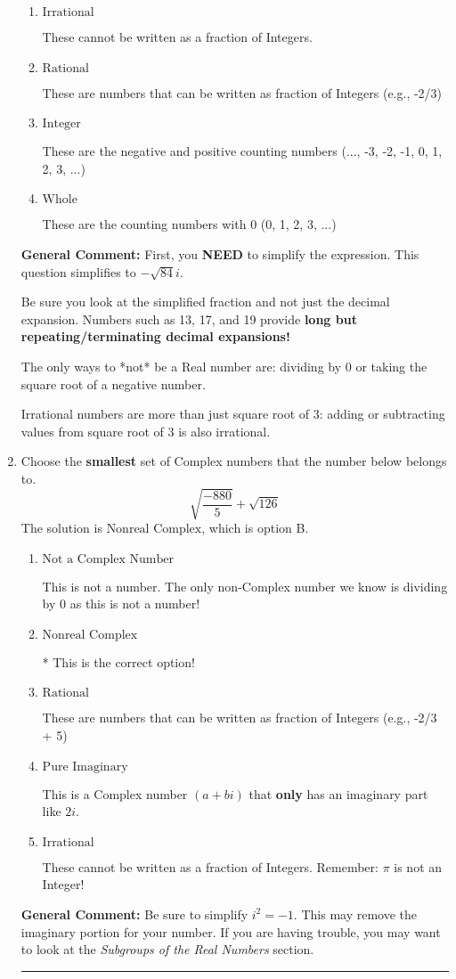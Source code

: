 \documentclass{extbook}[14pt]
\newcommand{\litem}[1]{\item #1

\rule{\textwidth}{0.4pt}}
\begin{document}
\begin{enumerate}
{\begin{enumerate}[label=\Alph*.]
* This is the correct option!
\item \( \text{Irrational} \)

These cannot be written as a fraction of Integers.
\item \( \text{Rational} \)

These are numbers that can be written as fraction of Integers (e.g., -2/3)
\item \( \text{Integer} \)

These are the negative and positive counting numbers (..., -3, -2, -1, 0, 1, 2, 3, ...)
\item \( \text{Whole} \)

These are the counting numbers with 0 (0, 1, 2, 3, ...)
\end{enumerate}

\textbf{General Comment:} First, you \textbf{NEED} to simplify the expression. This question simplifies to $-\sqrt{84} i$. 
 
 Be sure you look at the simplified fraction and not just the decimal expansion. Numbers such as 13, 17, and 19 provide \textbf{long but repeating/terminating decimal expansions!} 
 
 The only ways to *not* be a Real number are: dividing by 0 or taking the square root of a negative number. 
 
 Irrational numbers are more than just square root of 3: adding or subtracting values from square root of 3 is also irrational.
}
\litem{
Choose the \textbf{smallest} set of Complex numbers that the number below belongs to.
\[ \sqrt{\frac{-880}{5}}+\sqrt{126} \]The solution is \( \text{Nonreal Complex} \), which is option B.\begin{enumerate}[label=\Alph*.]
\item \( \text{Not a Complex Number} \)

This is not a number. The only non-Complex number we know is dividing by 0 as this is not a number!
\item \( \text{Nonreal Complex} \)

* This is the correct option!
\item \( \text{Rational} \)

These are numbers that can be written as fraction of Integers (e.g., -2/3 + 5)
\item \( \text{Pure Imaginary} \)

This is a Complex number $(a+bi)$ that \textbf{only} has an imaginary part like $2i$.
\item \( \text{Irrational} \)

These cannot be written as a fraction of Integers. Remember: $\pi$ is not an Integer!
\end{enumerate}

\textbf{General Comment:} Be sure to simplify $i^2 = -1$. This may remove the imaginary portion for your number. If you are having trouble, you may want to look at the \textit{Subgroups of the Real Numbers} section.
}
\end{enumerate}
\end{document}
